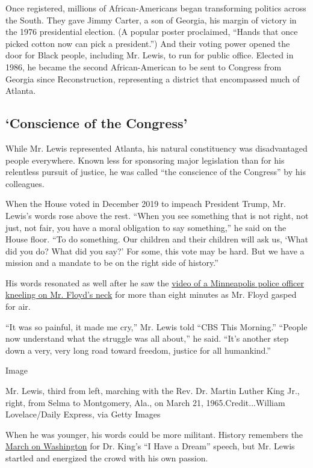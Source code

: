 Once registered, millions of African-Americans began transforming
politics across the South. They gave Jimmy Carter, a son of Georgia, his
margin of victory in the 1976 presidential election. (A popular poster
proclaimed, ``Hands that once picked cotton now can pick a president.'')
And their voting power opened the door for Black people, including Mr.
Lewis, to run for public office. Elected in 1986, he became the second
African-American to be sent to Congress from Georgia since
Reconstruction, representing a district that encompassed much of
Atlanta.

\hypertarget{conscience-of-the-congress}{%
\subsection{`Conscience of the
Congress'}\label{conscience-of-the-congress}}

While Mr. Lewis represented Atlanta, his natural constituency was
disadvantaged people everywhere. Known less for sponsoring major
legislation than for his relentless pursuit of justice, he was called
``the conscience of the Congress'' by his colleagues.

When the House voted in December 2019 to impeach President Trump, Mr.
Lewis's words rose above the rest. ``When you see something that is not
right, not just, not fair, you have a moral obligation to say
something,'' he said on the House floor. ``To do something. Our children
and their children will ask us, `What did you do? What did you say?' For
some, this vote may be hard. But we have a mission and a mandate to be
on the right side of history.''

His words resonated as well after he saw the
\href{https://www.nytimes.com/2020/05/31/us/george-floyd-investigation.html}{video
of a Minneapolis police officer kneeling on Mr. Floyd's neck} for more
than eight minutes as Mr. Floyd gasped for air.

``It was so painful, it made me cry,'' Mr. Lewis told ``CBS This
Morning.'' ``People now understand what the struggle was all about,'' he
said. ``It's another step down a very, very long road toward freedom,
justice for all humankind.''

Image

Mr. Lewis, third from left, marching with the Rev. Dr. Martin Luther
King Jr., right, from Selma to Montgomery, Ala., on March 21,
1965.Credit...William Lovelace/Daily Express, via Getty Images

When he was younger, his words could be more militant. History remembers
the
\href{https://archive.nytimes.com/www.nytimes.com/interactive/2013/08/24/us/march-on-washington-original-coverage.html}{March
on Washington} for Dr. King's ``I Have a Dream'' speech, but Mr. Lewis
startled and energized the crowd with his own passion.

